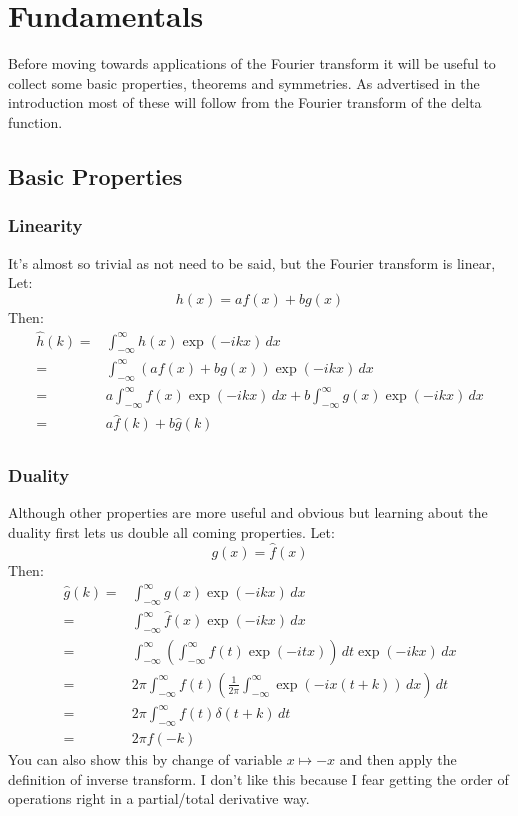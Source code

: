\chapter{Fundamentals}
Before moving towards applications of the Fourier transform it will be useful to collect some basic properties, theorems and symmetries.
As advertised in the introduction most of these will follow from the Fourier transform of the delta function.
\section{Basic Properties}
\subsection{Linearity}
It's almost so trivial as not need to be said, but the Fourier transform is linear,
Let:
\[h(x)=af(x)+bg(x)\]
Then:
\begin{equation*}
\begin{aligned}
\hat{h}(k) =& \int_{-\infty}^{\infty}h(x)\exp(-ikx)\,dx \\
=& \int_{-\infty}^{\infty}(af(x)+bg(x))\exp(-ikx)\,dx \\
=& a\int_{-\infty}^{\infty}f(x)\exp(-ikx)\,dx +b\int_{-\infty}^{\infty}g(x)\exp(-ikx)\,dx \\
=& a\hat{f}(k)+b\hat{g}(k) \\
\end{aligned}
\end{equation*}

\subsection{Duality}
Although other properties are more useful and obvious but learning about the duality first lets us double all coming properties.
Let:
\[g(x) = \hat{f}(x)\]
Then:
\begin{equation*}
\begin{aligned}
\hat{g}(k) =&\int_{-\infty}^{\infty}g(x)\exp(-ikx)\,dx \\
=&\int_{-\infty}^{\infty}\hat{f}(x)\exp(-ikx)\,dx \\
=& \int_{-\infty}^{\infty}\left(\int_{-\infty}^{\infty}f(t)\exp(-itx)\right)\,dt\exp(-ikx)\,dx \\
=& 2\pi\int_{-\infty}^{\infty} f(t) \left(\frac{1}{2\pi} \int_{-\infty}^{\infty} \exp(-ix(t+k))\,dx\right)\,dt \\
=& 2\pi\int_{-\infty}^{\infty} f(t) \delta(t+k)\,dt \\
=& 2\pi f(-k)
\end{aligned}
\end{equation*}
You can also show this by change of variable $x\mapsto -x$ and then apply the definition of inverse transform.
I don't like this because I fear getting the order of operations right in a partial/total derivative way.

